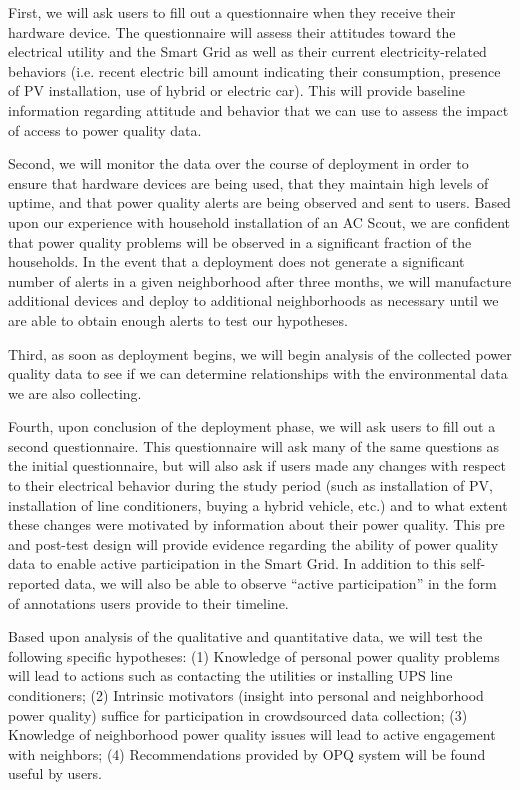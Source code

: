 First, we will ask users to fill out a questionnaire when they receive their hardware device.  The questionnaire will assess their attitudes toward the electrical utility and the Smart Grid as well as their current electricity-related behaviors (i.e. recent electric bill amount indicating their consumption, presence of PV installation, use of hybrid or electric car). This will provide baseline information regarding attitude and behavior that we can use to assess the impact of access to power quality data.

Second, we will monitor the data over the course of deployment in order to ensure that hardware devices are being used, that they maintain high levels of uptime, and that power quality alerts are being observed and sent to users.  Based upon our experience with household installation of an AC Scout, we are confident that power quality problems will be observed in a significant fraction of the households.  In the event that a deployment does not generate a significant number of alerts in a given neighborhood after three months, we will manufacture additional devices and deploy to additional neighborhoods as necessary until we are able to obtain enough alerts to test our hypotheses.

Third, as soon as deployment begins, we will begin analysis of the collected power quality data to see if we can determine relationships with the environmental data we are also collecting. 

Fourth, upon conclusion of the deployment phase, we will ask users to fill out a second questionnaire.  This questionnaire will ask many of the same questions as the initial questionnaire, but will also ask if users made any changes with respect to their electrical behavior during the study period (such as installation of PV, installation of line conditioners, buying a hybrid vehicle, etc.) and to what extent these changes were motivated by information about their power quality.  This pre and post-test design will provide evidence regarding the ability of power quality data to enable active participation in the Smart Grid.  In addition to this self-reported data, we will also be able to observe ``active participation'' in the form of annotations users provide to their timeline.

Based upon analysis of the qualitative and quantitative data, we will test the following specific hypotheses: (1) Knowledge of personal power quality problems will lead to actions such as contacting the utilities or installing UPS line conditioners; (2) Intrinsic motivators (insight into personal and neighborhood power quality) suffice for participation in crowdsourced data collection; (3) Knowledge of neighborhood power quality issues will lead to active engagement with neighbors; (4) Recommendations provided by OPQ system will be found useful by users.





















